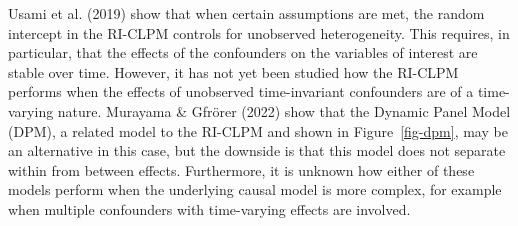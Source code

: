 \documentclass[
]{interact}
\begin{document}
Usami et al. (2019) show that when certain assumptions are met, the
random intercept in the RI-CLPM controls for unobserved heterogeneity.
This requires, in particular, that the effects of the confounders on the
variables of interest are stable over time. However, it has not yet been
studied how the RI-CLPM performs when the effects of unobserved
time-invariant confounders are of a time-varying nature. Murayama \&
Gfrörer (2022) show that the Dynamic Panel Model (DPM), a related model
to the RI-CLPM and shown in Figure~\ref{fig-dpm}, may be an alternative
in this case, but the downside is that this model does not separate
within from between effects. Furthermore, it is unknown how either of
these models perform when the underlying causal model is more complex,
for example when multiple confounders with time-varying effects are
involved.
\end{document}

